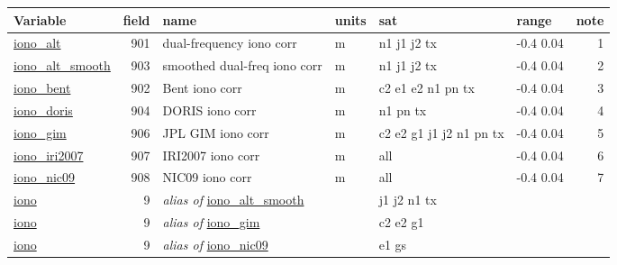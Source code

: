 \documentclass[a4paper,11pt,openany,natbib]{thesis}
\makeatletter
\newcommand\var[1]{\url{#1}\index{variables!#1@\protect\url{#1}}}
\newcommand\alias[1]{\emph{alias of} \var{#1}}
\newenvironment{vartable}{
\begin{table}[ht]
\small
\begin{tabular}{lrllllr}
\hline
Variable & field & name & units & sat & range & note \\
\hline
}{
\hline
\end{tabular}
\end{table}
}
\makeatother
\begin{document}
\begin{vartable}
\var{iono_alt} & 901 & dual-frequency iono corr & m & n1 j1 j2 tx & -0.4 0.04 & 1 \\
\var{iono_alt_smooth} & 903 & smoothed dual-freq iono corr & m & n1 j1 j2 tx & -0.4 0.04 & 2 \\
\var{iono_bent} & 902 & Bent iono corr & m & c2 e1 e2 n1 pn tx & -0.4 0.04 & 3 \\
\var{iono_doris} & 904 & DORIS iono corr & m & n1 pn tx & -0.4 0.04 & 4 \\
\var{iono_gim} & 906 & JPL GIM iono corr & m & c2 e2 g1 j1 j2 n1 pn tx & -0.4 0.04 & 5 \\
\var{iono_iri2007} & 907 & IRI2007 iono corr & m & all & -0.4 0.04 & 6 \\
\var{iono_nic09} & 908 & NIC09 iono corr & m & all & -0.4 0.04 & 7 \\
\hline
\var{iono} & 9 & \alias{iono_alt_smooth} & & j1 j2 n1 tx & \\
\var{iono} & 9 & \alias{iono_gim} & & c2 e2 g1 & \\
\var{iono} & 9 & \alias{iono_nic09} & & e1 gs & \\
\end{vartable}
\end{document}
